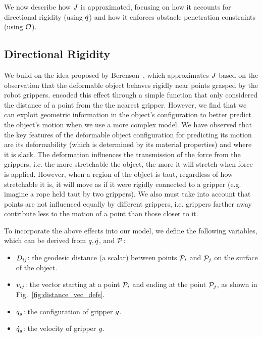 We now describe how $J$ is approximated, focusing on how it accounts for directional rigidity (using $\dot{q}$) and how it enforces obstacle penetration constraints (using $\mathcal{O}$).

\subsection{Directional Rigidity}

We build on the idea proposed by Berenson~\cite{Berenson2013}, which approximates $J$ based on the observation that the deformable object behaves rigidly near points grasped by the robot grippers. \cite{Berenson2013} encoded this effect through a simple function that only considered the distance of a point from the the nearest gripper. However, we find that we can exploit geometric information in the object's configuration to better predict the object's motion when we use a more complex model. We have observed that the key features of the deformable object configuration for predicting its motion are its deformability (which is determined by its material properties) and where it is slack. The deformation influences the transmission of the force from the grippers, i.e. the more stretchable the object, the more it will stretch when force is applied. However, when a region of the object is taut, regardless of how stretchable it is, it will move as if it were rigidly connected to a gripper (e.g. imagine a rope held taut by two grippers). We also must take into account that points are not influenced equally by different grippers, i.e. grippers farther away contribute less to the motion of a point than those closer to it.

To incorporate the above effects into our model, we define the following variables, which can be derived from $q, \dot{q}$, and $\mathcal{P}$:
\begin{itemize}
    \item $D_{i j}$: the geodesic distance (a scalar) between points $\mathcal{P}_i$ and $\mathcal{P}_j$ on the surface of the object.
    \item $v_{i j}$: the vector starting at a point $\mathcal{P}_i$ and ending at the point $\mathcal{P}_j$, as shown in Fig.~\ref{fig:distance_vec_defs}.
    \item $q_g$: the configuration of gripper $g$.
    \item $\dot{q}_g$: the velocity of gripper $g$.
\end{itemize}

